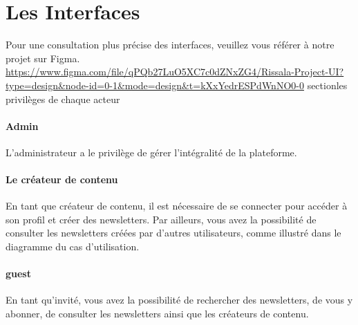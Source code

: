 \chapter{Les Interfaces}
Pour une consultation plus précise des interfaces, veuillez vous référer à notre projet sur Figma.
\url{https://www.figma.com/file/qPQb27LuO5XC7c0dZNxZG4/Rissala-Project-UI?type=design&node-id=0-1&mode=design&t=kXxYedrESPdWnNO0-0}
section{les privilèges de chaque acteur}
\subsubsection{Admin}
L'administrateur a le privilège de gérer l'intégralité de la plateforme.



\subsubsection{Le créateur de contenu}
En tant que créateur de contenu, il est nécessaire de se connecter pour accéder à son profil et créer des newsletters. Par ailleurs, vous avez la possibilité de consulter les newsletters créées par d'autres utilisateurs, comme illustré dans le diagramme du cas d'utilisation. 
\subsubsection{guest}
En tant qu'invité, vous avez la possibilité de rechercher des newsletters, de vous y abonner, de consulter les newsletters ainsi que les créateurs de contenu.
